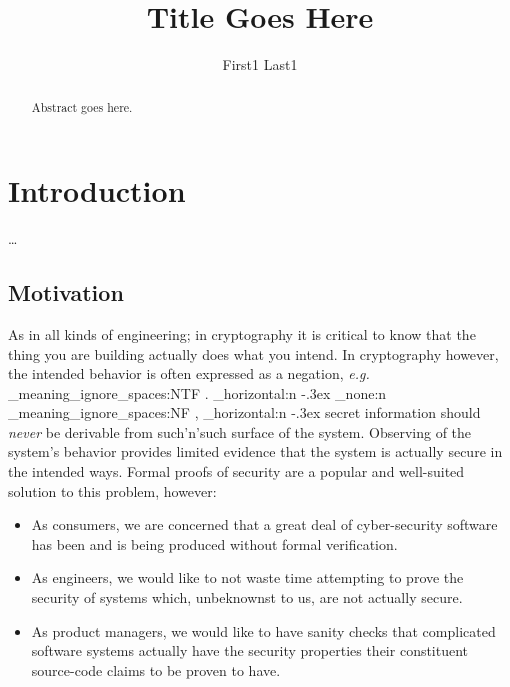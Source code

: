 \documentclass[conference]{IEEEtran}
\title{Title Goes Here}
\author{First1 Last1}
\begin{document}
\newtheorem{definition}{Definition}

\ExplSyntaxOn    %
\newcommand { \eg }
{ \textit{e.g.}
  \peek_meaning_ignore_spaces:NTF .
    { \skip_horizontal:n { -.3ex } \use_none:n }
    { \peek_meaning_ignore_spaces:NF , { \skip_horizontal:n { -.3ex } } }
}
\newcommand { \ie }
{ \textit{i.e.}
  \peek_meaning_ignore_spaces:NTF .
    { \skip_horizontal:n { -.3ex } \use_none:n }
    { \peek_meaning_ignore_spaces:NF , { \skip_horizontal:n { -.3ex } } }
}
\ExplSyntaxOff

\newcommand{\termOfArt}[1]{\textbf{#1}}


\maketitle

\begin{abstract}
  Abstract goes here.
\end{abstract}

\section{Introduction}

\dots  %

\subsection{Motivation}

As in all kinds of engineering; in cryptography it is critical to know that the thing you are building actually does what you intend.
In cryptography however, the intended behavior is often expressed as a negation,
\eg secret information should \textit{never} be derivable from such'n'such surface of the system.
Observing of the system's behavior provides limited evidence that the system is actually secure in the intended ways.
Formal proofs of security are a popular and well-suited solution to this problem, however:

\begin{itemize}
    \item As consumers, we are concerned that a great deal of cyber-security software has been and is being produced without formal verification.
    \item As engineers, we would like to not waste time attempting to prove the security of systems which, unbeknownst to us, are not actually secure.
    \item As product managers, we would like to have sanity checks
          that complicated software systems actually have the security properties their constituent source-code claims to be proven to have.
\end{itemize}
\end{document}
